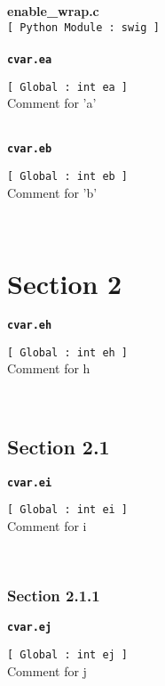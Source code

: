 \setlength{\parindent}{0.0in}
\setlength{\textwidth}{6.5in}
\setlength{\oddsidemargin}{0.0in}
\pagestyle{headings}

{\Large \bf  enable\_wrap.c }\\
{\tt [ Python Module : swig ]  }\\
\\{\tt \bf cvar.ea }
\\
\makebox[0.5in]{}\begin{minipage}[t]{6in}
{\tt [ Global : int  ea ]  }\\
   Comment for 'a'   
\\

\end{minipage}\\

{\tt \bf cvar.eb }
\\
\makebox[0.5in]{}\begin{minipage}[t]{6in}
{\tt [ Global : int  eb ]  }\\
   Comment for 'b'   
\\

\end{minipage}\\

\section{Section 2}{\tt \bf cvar.eh }
\\
\makebox[0.5in]{}\begin{minipage}[t]{6in}
{\tt [ Global : int  eh ]  }\\
   Comment for h   
\\

\end{minipage}\\

\subsection{Section 2.1}{\tt \bf cvar.ei }
\\
\makebox[0.5in]{}\begin{minipage}[t]{6in}
{\tt [ Global : int  ei ]  }\\
   Comment for i   
\\

\end{minipage}\\

\subsubsection{Section 2.1.1}{\tt \bf cvar.ej }
\\
\makebox[0.5in]{}\begin{minipage}[t]{6in}
{\tt [ Global : int  ej ]  }\\
   Comment for j   
\\

\end{minipage}\\

